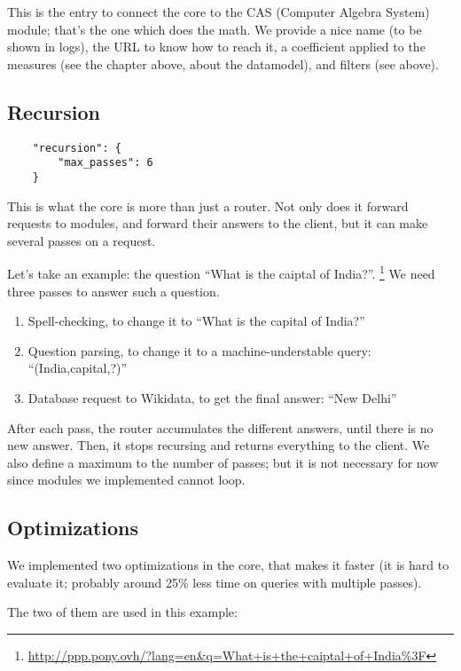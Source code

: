 This is the entry to connect the core to the CAS (Computer Algebra System)
module; that's the one which does the math. We provide a nice name (to be
shown in logs), the URL to know how to reach it, a coefficient applied to
the measures (see the chapter above, about the datamodel), and filters
(see above).

\subsection{Recursion}

\begin{verbatim}
    "recursion": {
        "max_passes": 6
    }
\end{verbatim}

This is what the core is more than just a router. Not only does it forward
requests to modules, and forward their answers to the client, but it can
make several passes on a request.

Let's take an example: the question “What is the caiptal of India?”.
\footnote{\url{http://ppp.pony.ovh/?lang=en&q=What+is+the+caiptal+of+India\%3F}}
We need three passes to answer such a question.

\begin{enumerate}
    \item Spell-checking, to change it to “What is the capital of India?”
    \item Question parsing, to change it to a machine-understable query:
        “(India,capital,?)”
    \item Database request to Wikidata, to get the final answer:
        “New Delhi”
\end{enumerate}

After each pass, the router accumulates the different answers, until
there is no new answer. Then, it stops recursing and returns everything
to the client.
We also define a maximum to the number of passes; but it is not necessary
for now since modules we implemented cannot loop.

\subsection{Optimizations}

We implemented two optimizations in the core, that makes it faster (it is hard
to evaluate it; probably around 25\% less time on queries with multiple
passes).

The two of them are used in this example:

